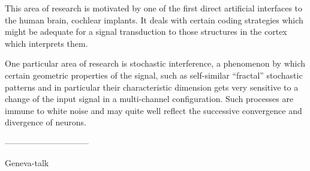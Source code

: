 \documentclass[pra,amsfonts,showpacs,preprint,showkeys]{revtex4}
\begin{document}
This area of research is motivated by one of the first direct artificial interfaces to the
human brain, cochlear implants.
It deals with certain coding strategies which might be adequate for a signal transduction to
those structures in the cortex which interprets them.

One particular area of research is stochastic interference,
a phenomenon by which certain geometric properties of the
signal, such as self-similar ``fractal'' stochastic patterns and in particular
their characteristic dimension gets very sensitive to a change of the input signal
in a multi-channel configuration.
Such processes are immune to white noise and may quite well reflect the
successive convergence and divergence of neurons.

------------------------------

Geneva-talk
\end{document}
